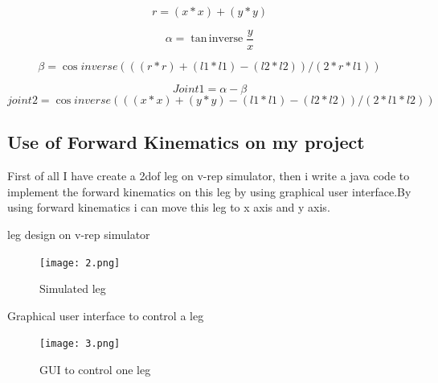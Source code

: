 \documentclass [a4paper ] {report}
\DeclareMathOperator{\taninv}{tan\,inverse}
\begin{document}
\begin{equation}
r=(x*x)+(y*y)
\end{equation}

\begin{equation}
\alpha=\taninv\frac{y}{x}
\end{equation}

\begin{equation}
\beta=\cos inverse(((r*r)+(l1*l1)-(l2*l2))/(2*r*l1))
\end{equation}

\begin{equation}
Joint1=\alpha-\beta
\end{equation}
\begin{equation}
joint2=\cos inverse(((x*x)+(y*y)-(l1*l1)-(l2*l2))/(2*l1*l2))
\end{equation}
\newpage


\subsection{Use of Forward Kinematics on my project}
First of all I have create a 2dof leg on v-rep simulator, then i write a java code to implement the forward kinematics on this leg by using graphical user interface.By using forward kinematics i can move this leg to x axis and y axis.








\begin{center}
 leg design on v-rep simulator\vadjust{\vskip 10mm \vskip 0pt}
\begin{figure}[h]
\begin{center}
\texttt{[image: 2.png]}
\end{center}
\caption{Simulated leg \vadjust{\vskip 10mm \vskip 0pt}}
\label{fig:fig2}
\end{figure}
\end{center}
\hfill \break




\begin{center}
Graphical user interface to control a leg
\vadjust{\vskip 10mm \vskip 0pt}
\begin{figure}[h]
\begin{center}
\texttt{[image: 3.png]}
\end{center}
\caption{GUI to control one leg\vadjust{\vskip 10mm \vskip 0pt}}
\label{fig:fig2}
\end{figure}
\end{center}
\hfill \break
\end{document}
